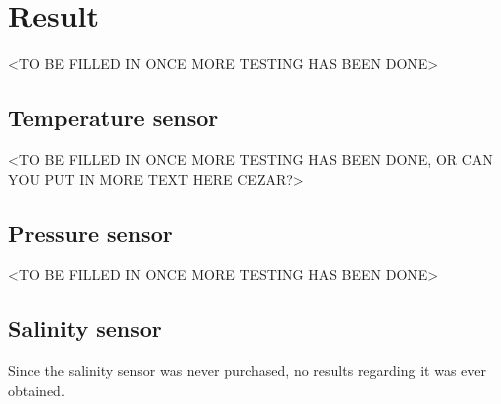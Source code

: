 
\section{Result}\label{sec:result}
<TO BE FILLED IN ONCE MORE TESTING HAS BEEN DONE>

\subsection{Temperature sensor}
<TO BE FILLED IN ONCE MORE TESTING HAS BEEN DONE, OR CAN YOU PUT IN MORE TEXT HERE CEZAR?>

\subsection{Pressure sensor}
<TO BE FILLED IN ONCE MORE TESTING HAS BEEN DONE>

\subsection{Salinity sensor}
Since the salinity sensor was never purchased, no results regarding it was ever obtained.

